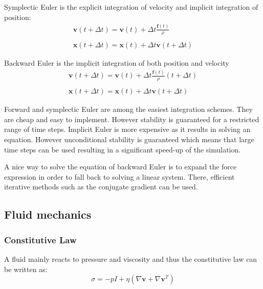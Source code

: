 Symplectic Euler is the explicit integration of velocity and implicit integration of position:
\begin{equation}
\label{eq:symplecticEuler}
\begin{array}{l}
\displaystyle \mathbf{v}(t+\Delta t) = \mathbf{v}(t) + \Delta t \frac{\mathbf{f}(t)}{\rho} \\ \\
\displaystyle \mathbf{x}(t+\Delta t) = \mathbf{x}(t) + \Delta t \mathbf{v}(t+\Delta t)
\end{array}
\end{equation}

Backward Euler is the implicit integration of both position and velocity
\begin{equation}
\label{eq:backwardEuler}
\begin{array}{ll}
\displaystyle \mathbf{v}(t+\Delta t) = \mathbf{v}(t) + \Delta t \frac{\mathbf{f}(t)}{\rho}(t+\Delta t) \\ \\
\displaystyle \mathbf{x}(t+\Delta t) = \mathbf{x}(t) + \Delta t \mathbf{v}(t+\Delta t)
\end{array}
\end{equation}

Forward and symplectic Euler are among the easiest integration schemes. They are cheap and easy to implement. However stability is guaranteed for a restricted range of time steps. Implicit Euler is more expensive as it results in solving an equation. However unconditional stability is guaranteed which means that large time steps can be used resulting in a significant speed-up of the simulation.

A nice way to solve the equation of backward Euler is to expand the force expression in order to fall back to solving a linear system. There, efficient iterative methods such as the conjugate gradient can be used.

\subsection{Fluid mechanics}
\label{subsec:fluidMechanics}

\subsubsection{Constitutive Law}

A fluid mainly reacts to pressure and viscosity and thus the constitutive law can be written as:
\begin{equation}
\sigma = -pI + \eta \left( \nabla \mathbf{v} + \nabla \mathbf{v}^{T} \right)
\end{equation}

